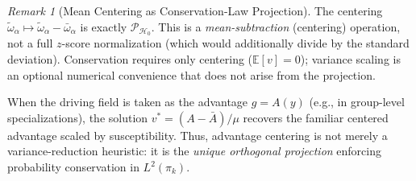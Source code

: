 \documentclass[11pt]{article}
\theoremstyle{definition}
\theoremstyle{remark}
\newtheorem{remark}[theorem]{Remark}
\newcommand{\E}{\mathbb{E}}
\newcommand{\pik}{\pi_k}
\begin{document}
\begin{remark}[Mean Centering as Conservation-Law Projection]
\label{rem:zscore}
The centering $\tilde{\omega}_\alpha \mapsto \tilde{\omega}_\alpha - \bar{\omega}_\alpha$ is exactly $\mathcal{P}_{\mathcal{H}_0}$. This is a \emph{mean-subtraction} (centering) operation, not a full $z$-score normalization (which would additionally divide by the standard deviation). Conservation requires only centering ($\E[v]=0$); variance scaling is an optional numerical convenience that does not arise from the projection.

When the driving field is taken as the advantage $g = A(y)$ (e.g., in group-level specializations), the solution $v^* = (A - \bar{A})/\mu$ recovers the familiar centered advantage scaled by susceptibility. Thus, advantage centering is not merely a variance-reduction heuristic: it is the \emph{unique orthogonal projection} enforcing probability conservation in $L^2(\pik)$.
\end{remark}
\end{document}

